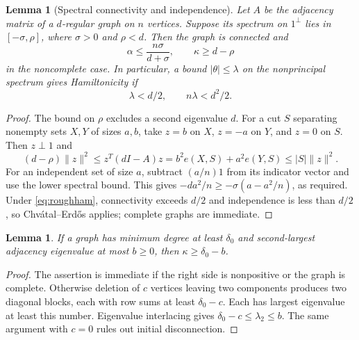 \documentclass[11pt]{article}
\newtheorem{lemma}[theorem]{Lemma}
\theoremstyle{definition}
\begin{document}
\begin{lemma}[Spectral connectivity and independence]\label{lem:spectral}
Let $A$ be the adjacency matrix of a $d$-regular graph on $n$ vertices. Suppose its spectrum on $1^\perp$ lies in $[-\sigma,\rho]$, where $\sigma>0$ and $\rho<d$. Then the graph is connected and
\[
\alpha\le\frac{n\sigma}{d+\sigma},\qquad \kappa\ge d-\rho
\]
in the noncomplete case. In particular, a bound $|\theta|\le\lambda$ on the nonprincipal spectrum gives Hamiltonicity if
\begin{equation}\label{eq:roughham}
\lambda<d/2,\qquad n\lambda<d^2/2.
\end{equation}
\end{lemma}
\begin{proof}
The bound on $\rho$ excludes a second eigenvalue $d$. For a cut $S$ separating nonempty sets $X,Y$ of sizes $a,b$, take $z=b$ on $X$, $z=-a$ on $Y$, and $z=0$ on $S$. Then $z\perp1$ and
\[
(d-\rho)\|z\|^2\le z^T(dI-A)z
=b^2e(X,S)+a^2e(Y,S)\le |S|\|z\|^2.
\]
For an independent set of size $a$, subtract $(a/n)1$ from its indicator vector and use the lower spectral bound. This gives $-da^2/n\ge-\sigma(a-a^2/n)$, as required. Under \eqref{eq:roughham}, connectivity exceeds $d/2$ and independence is less than $d/2$, so Chv\'atal--Erd\H{o}s applies; complete graphs are immediate.
\end{proof}
\begin{lemma}\label{lem:irregular}
If a graph has minimum degree at least $\delta_0$ and second-largest adjacency eigenvalue at most $b\ge0$, then $\kappa\ge\delta_0-b$.
\end{lemma}
\begin{proof}
The assertion is immediate if the right side is nonpositive or the graph is complete. Otherwise deletion of $c$ vertices leaving two components produces two diagonal blocks, each with row sums at least $\delta_0-c$. Each has largest eigenvalue at least this number. Eigenvalue interlacing gives $\delta_0-c\le\lambda_2\le b$. The same argument with $c=0$ rules out initial disconnection.
\end{proof}
\end{document}
